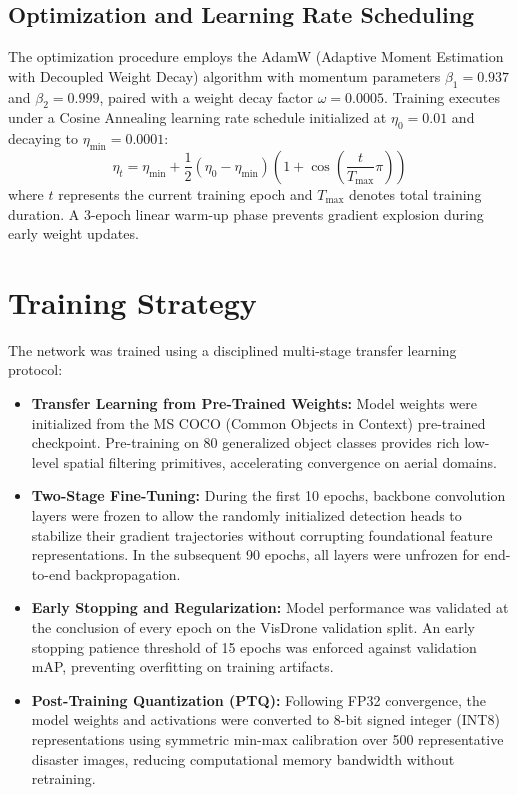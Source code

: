 \subsection{Optimization and Learning Rate Scheduling}
The optimization procedure employs the AdamW (Adaptive Moment Estimation with Decoupled Weight Decay) algorithm with momentum parameters $\beta_1 = 0.937$ and $\beta_2 = 0.999$, paired with a weight decay factor $\omega = 0.0005$. Training executes under a Cosine Annealing learning rate schedule initialized at $\eta_0 = 0.01$ and decaying to $\eta_{\text{min}} = 0.0001$:
\begin{equation}
    \eta_t = \eta_{\text{min}} + \frac{1}{2}(\eta_0 - \eta_{\text{min}})\left(1 + \cos\left(\frac{t}{T_{\text{max}}}\pi\right)\right)
\end{equation}
where $t$ represents the current training epoch and $T_{\text{max}}$ denotes total training duration. A 3-epoch linear warm-up phase prevents gradient explosion during early weight updates.

\section{Training Strategy}

The network was trained using a disciplined multi-stage transfer learning protocol:
\begin{itemize}
    \item \textbf{Transfer Learning from Pre-Trained Weights:} Model weights were initialized from the MS COCO (Common Objects in Context) pre-trained checkpoint. Pre-training on 80 generalized object classes provides rich low-level spatial filtering primitives, accelerating convergence on aerial domains.
    \item \textbf{Two-Stage Fine-Tuning:} During the first 10 epochs, backbone convolution layers were frozen to allow the randomly initialized detection heads to stabilize their gradient trajectories without corrupting foundational feature representations. In the subsequent 90 epochs, all layers were unfrozen for end-to-end backpropagation.
    \item \textbf{Early Stopping and Regularization:} Model performance was validated at the conclusion of every epoch on the VisDrone validation split. An early stopping patience threshold of 15 epochs was enforced against validation mAP, preventing overfitting on training artifacts.
    \item \textbf{Post-Training Quantization (PTQ):} Following FP32 convergence, the model weights and activations were converted to 8-bit signed integer (INT8) representations using symmetric min-max calibration over 500 representative disaster images, reducing computational memory bandwidth without retraining.
\end{itemize}

